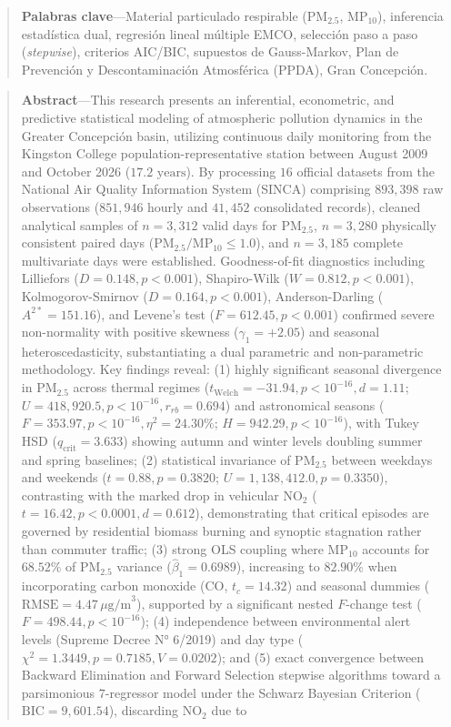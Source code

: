 \documentclass[10pt,twocolumn,a4paper]{article}
\begin{document}
{\begin{quotation}
    \vspace{0.12cm}
    \textbf{\color{navyblue}Palabras clave}---Material particulado respirable ($\text{PM}_{2.5}$, $\text{MP}_{10}$), inferencia estadística dual, regresión lineal múltiple EMCO, selección paso a paso (\textit{stepwise}), criterios AIC/BIC, supuestos de Gauss-Markov, Plan de Prevención y Descontaminación Atmosférica (PPDA), Gran Concepción.
  \end{quotation}

  \begin{quotation}
    \small
    \noindent\textbf{\color{navyblue}Abstract}---This research presents an inferential, econometric, and predictive statistical modeling of atmospheric pollution dynamics in the Greater Concepción basin, utilizing continuous daily monitoring from the Kingston College population-representative station between August 2009 and October 2026 ($17.2\text{ years}$). By processing $16$ official datasets from the National Air Quality Information System (SINCA) comprising $893,398$ raw observations ($851,946$ hourly and $41,452$ consolidated records), cleaned analytical samples of $n = 3,312$ valid days for $\text{PM}_{2.5}$, $n = 3,280$ physically consistent paired days ($\text{PM}_{2.5}/\text{MP}_{10} \le 1.0$), and $n = 3,185$ complete multivariate days were established. Goodness-of-fit diagnostics including Lilliefors ($D = 0.148, p < 0.001$), Shapiro-Wilk ($W = 0.812, p < 0.001$), Kolmogorov-Smirnov ($D = 0.164, p < 0.001$), Anderson-Darling ($A^{2*} = 151.16$), and Levene's test ($F = 612.45, p < 0.001$) confirmed severe non-normality with positive skewness ($\gamma_1 = +2.05$) and seasonal heteroscedasticity, substantiating a dual parametric and non-parametric methodology. Key findings reveal: (1) highly significant seasonal divergence in $\text{PM}_{2.5}$ across thermal regimes ($t_{\text{Welch}} = -31.94, p < 10^{-16}, d = 1.11$; $U = 418,920.5, p < 10^{-16}, r_{rb} = 0.694$) and astronomical seasons ($F = 353.97, p < 10^{-16}, \eta^2 = 24.30\%$; $H = 942.29, p < 10^{-16}$), with Tukey HSD ($q_{\text{crit}} = 3.633$) showing autumn and winter levels doubling summer and spring baselines; (2) statistical invariance of $\text{PM}_{2.5}$ between weekdays and weekends ($t = 0.88, p = 0.3820$; $U = 1,138,412.0, p = 0.3350$), contrasting with the marked drop in vehicular $\text{NO}_2$ ($t = 16.42, p < 0.0001, d = 0.612$), demonstrating that critical episodes are governed by residential biomass burning and synoptic stagnation rather than commuter traffic; (3) strong OLS coupling where $\text{MP}_{10}$ accounts for $68.52\%$ of $\text{PM}_{2.5}$ variance ($\hat{\beta}_1 = 0.6989$), increasing to $82.90\%$ when incorporating carbon monoxide ($\text{CO}$, $t_c = 14.32$) and seasonal dummies ($\text{RMSE} = 4.47\,\mu\text{g/m}^3$), supported by a significant nested $F$-change test ($F = 498.44, p < 10^{-16}$); (4) independence between environmental alert levels (Supreme Decree N° 6/2019) and day type ($\chi^2 = 1.3449, p = 0.7185, V = 0.0202$); and (5) exact convergence between Backward Elimination and Forward Selection stepwise algorithms toward a parsimonious $7$-regressor model under the Schwarz Bayesian Criterion ($\text{BIC} = 9,601.54$), discarding $\text{NO}_2$ due to 
\end{quotation}}
\end{document}
